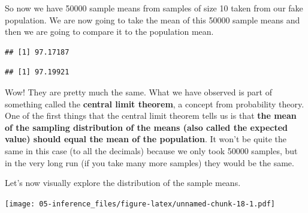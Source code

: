 \documentclass[
]{book}
\newenvironment{Shaded}{\begin{snugshade}}{\end{snugshade}}
\newcommand{\AttributeTok}[1]{\textcolor[rgb]{0.77,0.63,0.00}{#1}}
\newcommand{\CommentTok}[1]{\textcolor[rgb]{0.56,0.35,0.01}{\textit{#1}}}
\newcommand{\FunctionTok}[1]{\textcolor[rgb]{0.00,0.00,0.00}{#1}}
\newcommand{\NormalTok}[1]{#1}
\newcommand{\SpecialCharTok}[1]{\textcolor[rgb]{0.00,0.00,0.00}{#1}}
\newcommand{\StringTok}[1]{\textcolor[rgb]{0.31,0.60,0.02}{#1}}
\begin{document}
So now we have 50000 sample means from samples of size 10 taken from our fake population. We are now going to take the mean of this 50000 sample means and then we are going to compare it to the population mean.

\begin{Shaded}
\end{Shaded}

\begin{verbatim}
## [1] 97.17187
\end{verbatim}

\begin{Shaded}
\end{Shaded}

\begin{verbatim}
## [1] 97.19921
\end{verbatim}

Wow! They are pretty much the same. What we have observed is part of something called the \textbf{central limit theorem}, a concept from probability theory. One of the first things that the central limit theorem tells us is that \textbf{the mean of the sampling distribution of the means (also called the expected value) should equal the mean of the population}. It won't be quite the same in this case (to all the decimals) because we only took 50000 samples, but in the very long run (if you take many more samples) they would be the same.

Let's now visually explore the distribution of the sample means.

\begin{Shaded}
\end{Shaded}

\texttt{[image: 05-inference\_files/figure-latex/unnamed-chunk-18-1.pdf]}
\end{document}
